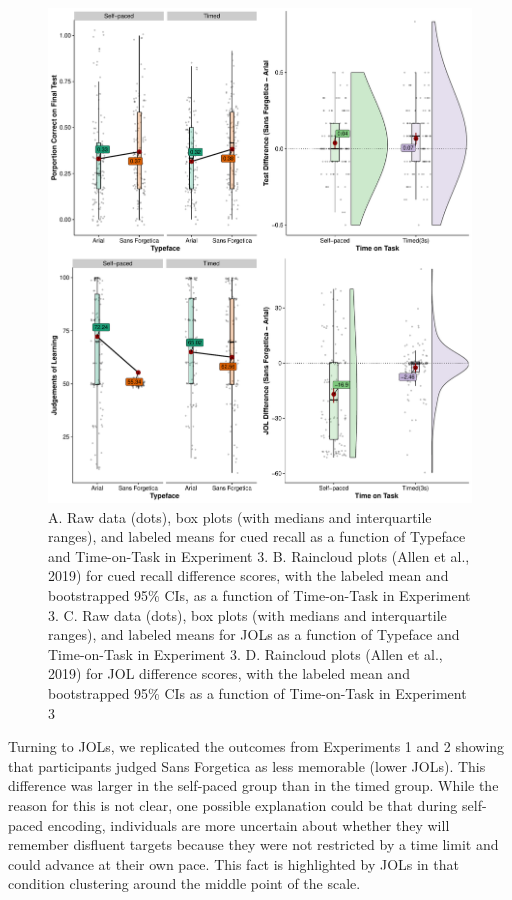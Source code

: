 \documentclass[
  english,
  jou]{apa7}
\begin{document}
\begin{figure}

{\centering \includegraphics{Testing_Expectancy_SF_RR_files/figure-latex/unnamed-chunk-74-1} 

}

\caption{A. Raw data (dots), box plots (with medians and interquartile ranges), and labeled means for cued recall as a function of Typeface and Time-on-Task in Experiment 3. B. Raincloud plots (Allen et al., 2019) for cued recall difference scores, with the labeled mean and bootstrapped 95\% CIs, as a function of Time-on-Task in Experiment 3. C. Raw data (dots), box plots (with medians and interquartile ranges), and labeled means for JOLs as a function of Typeface and Time-on-Task in Experiment 3. D. Raincloud plots (Allen et al., 2019) for JOL difference scores, with the labeled mean and bootstrapped 95\% CIs as a function of Time-on-Task in Experiment 3}\label{fig:unnamed-chunk-74}
\end{figure}

Turning to JOLs, we replicated the outcomes from Experiments 1 and 2 showing that participants judged Sans Forgetica as less memorable (lower JOLs). This difference was larger in the self-paced group than in the timed group. While the reason for this is not clear, one possible explanation could be that during self-paced encoding, individuals are more uncertain about whether they will remember disfluent targets because they were not restricted by a time limit and could advance at their own pace. This fact is highlighted by JOLs in that condition clustering around the middle point of the scale.
\end{document}
